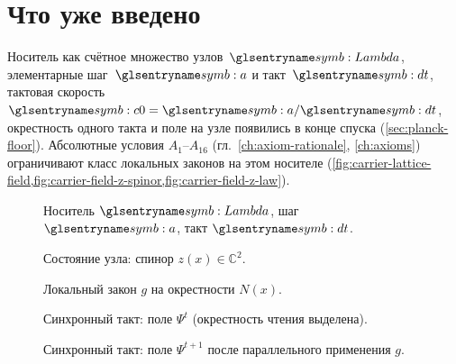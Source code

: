 \section{Что уже введено}
\label{sec:carrier-motivation}

Носитель как счётное множество узлов~$\carrierLattice$, элементарные шаг~$\caStepSpace$ и такт~$\htick$,
тактовая скорость $\caSignalSpeed=\caStepSpace/\htick$, окрестность одного такта и поле на узле
появились в конце спуска (\cref{sec:planck-floor}).
Абсолютные условия $A_1$--$A_{16}$ (гл.~\ref{ch:axiom-rationale}, \ref{ch:axioms})
ограничивают класс локальных законов на этом носителе
(\cref{fig:carrier-lattice-field,fig:carrier-field-z-spinor,fig:carrier-field-z-law}).

\begin{figure}[htbp]
  \centering
  
  \caption{Носитель $\carrierLattice$, шаг $\caStepSpace$, такт $\htick$.}
  \label{fig:carrier-lattice-field}
\end{figure}

\begin{figure}[htbp]
  \centering
  
  \caption{Состояние узла: спинор $z(x)\in\mathbb{C}^2$.}
  \label{fig:carrier-field-z-spinor}
\end{figure}

\begin{figure}[htbp]
  \centering
  
  \caption{Локальный закон $g$ на окрестности $N(x)$.}
  \label{fig:carrier-field-z-law}
\end{figure}

\begin{figure}[htbp]
  \centering
  
  \caption{Синхронный такт: поле $\Psi^t$ (окрестность чтения выделена).}
  \label{fig:carrier-sync-psi-t}
\end{figure}

\begin{figure}[htbp]
  \centering
  
  \caption{Синхронный такт: поле $\Psi^{t+1}$ после параллельного применения $g$.}
  \label{fig:carrier-sync-psi-t1}
\end{figure}

